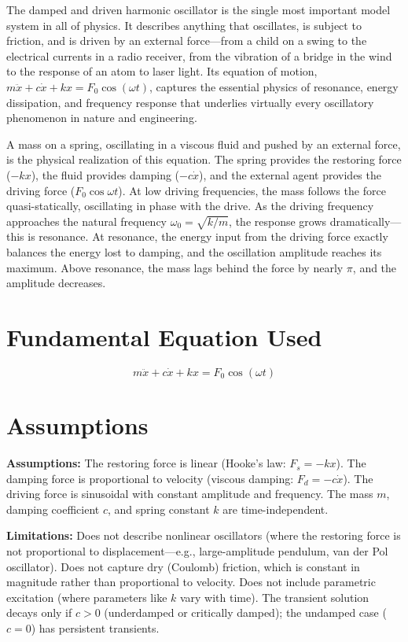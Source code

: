 \documentclass[11pt,openright]{book}
\begin{document}
The damped and driven harmonic oscillator is the single most important model system in all of physics. It describes anything that oscillates, is subject to friction, and is driven by an external force---from a child on a swing to the electrical currents in a radio receiver, from the vibration of a bridge in the wind to the response of an atom to laser light. Its equation of motion, $m\ddot{x} + c\dot{x} + kx = F_0\cos(\omega t)$, captures the essential physics of resonance, energy dissipation, and frequency response that underlies virtually every oscillatory phenomenon in nature and engineering.

A mass on a spring, oscillating in a viscous fluid and pushed by an external force, is the physical realization of this equation. The spring provides the restoring force ($-kx$), the fluid provides damping ($-c\dot{x}$), and the external agent provides the driving force ($F_0\cos\omega t$). At low driving frequencies, the mass follows the force quasi-statically, oscillating in phase with the drive. As the driving frequency approaches the natural frequency $\omega_0 = \sqrt{k/m}$, the response grows dramatically---this is resonance. At resonance, the energy input from the driving force exactly balances the energy lost to damping, and the oscillation amplitude reaches its maximum. Above resonance, the mass lags behind the force by nearly $\pi$, and the amplitude decreases.
\section*{Fundamental Equation Used}

\begin{equation}
m\ddot{x} + c\dot{x} + kx = F_0\cos(\omega t)
\end{equation}
\section*{Assumptions}

\textbf{Assumptions:} The restoring force is linear (Hooke's law: $F_s = -kx$). The damping force is proportional to velocity (viscous damping: $F_d = -c\dot{x}$). The driving force is sinusoidal with constant amplitude and frequency. The mass $m$, damping coefficient $c$, and spring constant $k$ are time-independent.


\textbf{Limitations:} Does not describe nonlinear oscillators (where the restoring force is not proportional to displacement---e.g., large-amplitude pendulum, van der Pol oscillator). Does not capture dry (Coulomb) friction, which is constant in magnitude rather than proportional to velocity. Does not include parametric excitation (where parameters like $k$ vary with time). The transient solution decays only if $c > 0$ (underdamped or critically damped); the undamped case ($c = 0$) has persistent transients.
\end{document}
